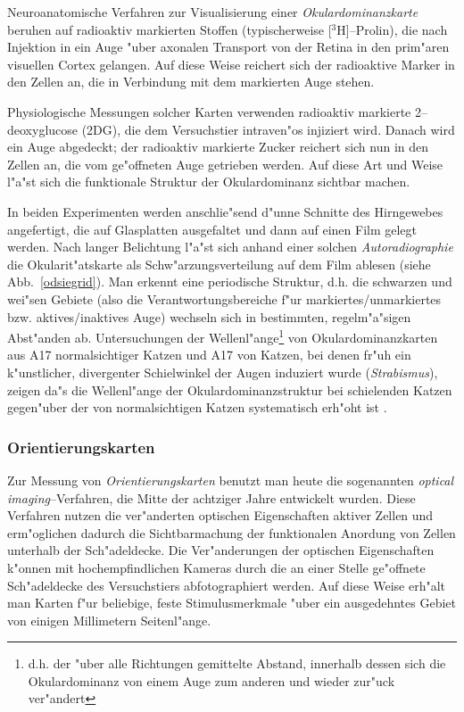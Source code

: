 Neuroanatomische Verfahren zur Visualisierung einer
\emph{Okulardominanzkarte} beruhen auf radioaktiv markierten Stoffen
(typischerweise [$^3$H]--Prolin), die nach Injektion in ein Auge "uber
axonalen Transport von der Retina in den prim"aren visuellen Cortex
gelangen.  Auf diese Weise reichert sich der radioaktive Marker in den
Zellen an, die in Verbindung mit dem markierten Auge stehen.

Physiologische Messungen solcher Karten verwenden radioaktiv markierte
\mbox{2--deoxyglucose} (2DG), die dem Versuchstier intraven"os injiziert
wird. Danach wird ein Auge abgedeckt; der radioaktiv markierte Zucker
reichert sich nun in den Zellen an, die vom ge"offneten Auge getrieben
werden. Auf diese Art und Weise l"a"st sich die funktionale Struktur der
Okulardominanz sichtbar machen.

\setcounter{footnote}{1}
In beiden Experimenten werden anschlie"send d"unne Schnitte des Hirngewebes
angefertigt, die auf Glasplatten ausgefaltet und dann auf einen Film gelegt
werden. Nach langer Belichtung l"a"st sich anhand einer solchen
\emph{Autoradiographie} die Okularit"atskarte als Schw"arzungsverteilung
auf dem Film ablesen (siehe Abb.~\ref{odsiegrid}). Man erkennt eine
periodische Struktur, d.h. die schwarzen und wei"sen Gebiete (also die
Verantwortungsbereiche f"ur markiertes/unmarkiertes bzw. aktives/inaktives
Auge) wechseln sich in bestimmten, regelm"a"sigen Abst"anden ab.
Untersuchungen der Wellenl"ange\footnote{d.h. der "uber alle Richtungen
gemittelte Abstand, innerhalb dessen sich die Okulardominanz von einem Auge
zum anderen und wieder zur"uck ver"andert} von Okulardominanzkarten aus A17
normalsichtiger Katzen und A17 von Katzen, bei denen fr"uh ein
k"unstlicher, divergenter Schielwinkel der Augen induziert wurde
(\emph{Strabismus}), zeigen da"s die Wellenl"ange der
Okulardominanzstruktur bei schielenden Katzen gegen"uber der von
normalsichtigen Katzen systematisch erh"oht ist \cite{loewel:1994}.
\setcounter{footnote}{1}

\subsubsection{Orientierungskarten}

Zur Messung von \emph{Orientierungskarten} benutzt man heute die
sogenannten \emph{optical imaging}--Verfahren, die Mitte der achtziger
Jahre entwickelt wurden. Diese Verfahren nutzen die ver"anderten optischen
Eigenschaften aktiver Zellen und erm"oglichen dadurch die Sichtbarmachung
der funktionalen Anordung von Zellen unterhalb der Sch"adeldecke. Die
Ver"anderungen der optischen Eigenschaften k"onnen mit hochempfindlichen
Kameras durch die an einer Stelle ge"offnete Sch"adeldecke des
Versuchstiers abfotographiert werden.  Auf diese Weise erh"alt man Karten
f"ur beliebige, feste Stimulusmerkmale "uber ein ausgedehntes Gebiet von
einigen Millimetern Seitenl"ange.

